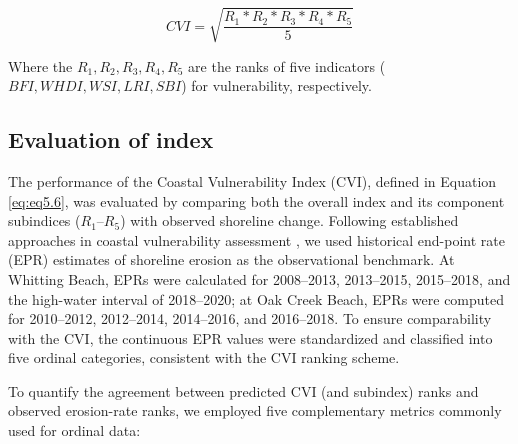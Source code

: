 \begin{equation}
    CVI = \sqrt{\frac{R_1*R_2*R_3*R_4*R_5}{5}}
\label{eq:eq5.6}
\end{equation}

Where the $R_1,R_2,R_3,R_4,R_5$ are the ranks of five indicators ($BFI, WHDI, WSI,LRI,
SBI$) for vulnerability, respectively.

\subsection{Evaluation of index}
\label{Evaluation of index}
The performance of the Coastal Vulnerability Index (CVI), defined in Equation
\ref{eq:eq5.6}, was evaluated by comparing both the overall index and its
component subindices ($R_{1}$–$R_{5}$) with observed shoreline change. Following
established approaches in coastal vulnerability assessment
\citep[\eg][]{fuller2002bank,thieler2000national}, we used historical end-point
rate (EPR) estimates of shoreline erosion as the observational benchmark. At
Whitting Beach, EPRs were calculated for 2008–2013, 2013–2015, 2015–2018, and
the high-water interval of 2018–2020; at Oak Creek Beach, EPRs were computed for
2010–2012, 2012–2014, 2014–2016, and 2016–2018. To ensure comparability with the
CVI, the continuous EPR values were standardized and classified into five
ordinal categories, consistent with the CVI ranking scheme.  

To quantify the agreement between predicted CVI (and subindex) ranks and
observed erosion-rate ranks, we employed five complementary metrics commonly
used for ordinal data:

